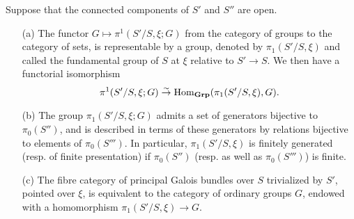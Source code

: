 \begin{proposition}\label{scheme relative fundamental group representable prop}
Suppose that the connected components of $S'$ and $S''$ are open.
\begin{enumerate}
    \item[(a)] The functor $G\mapsto\pi^1(S'/S,\xi;G)$ from the category of groups to the category of sets, is representable by a group, denoted by $\pi_1(S'/S,\xi)$ and called the fundamental group of $S$ at $\xi$ relative to $S'\to S$. We then have a functorial isomorphism
    \[\pi^1(S'/S,\xi;G)\stackrel{\sim}{\to}\mathrm{Hom}_{\mathbf{Grp}}(\pi_1(S'/S,\xi),G).\]
    \item[(b)] The group $\pi_1(S'/S,\xi;G)$ admits a set of generators bijective to $\pi_0(S'')$, and is described in terms of these generators by relations bijective to elements of $\pi_0(S''')$. In particular, $\pi_1(S'/S,\xi)$ is finitely generated (resp. of finite presentation) if $\pi_0(S'')$ (resp. as well as $\pi_0(S''')$) is finite.
    \item[(c)] The fibre category of principal Galois bundles over $S$ trivialized by $S'$, pointed over $\xi$, is equivalent to the category of ordinary groups $G$, endowed with a homomorphism $\pi_1(S'/S,\xi)\to G$.
\end{enumerate}
\end{proposition}

